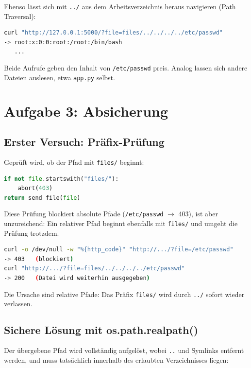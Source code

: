 \documentclass[
	fontsize=12pt,
	paper=a4,
	numbers=noenddot,
	listof=totoc,
	listof=entryprefix,
	listof=nochaptergap,
	bibliography=totoc,
	parskip=half,
	openany
]{scrbook}
\begin{document}
Ebenso lässt sich mit \texttt{../} aus dem Arbeitsverzeichnis heraus navigieren
(Path Traversal):

\begin{lstlisting}[language=bash]
curl "http://127.0.0.1:5000/?file=files/../../../../etc/passwd"
-> root:x:0:0:root:/root:/bin/bash
   ...
\end{lstlisting}

Beide Aufrufe geben den Inhalt von \texttt{/etc/passwd} preis. Analog lassen sich
andere Dateien auslesen, etwa \texttt{app.py} selbst.

\chapter*{Aufgabe 3: Absicherung}

\section*{Erster Versuch: Präfix-Prüfung}

Geprüft wird, ob der Pfad mit \texttt{files/} beginnt:

\begin{lstlisting}[language=Python]
if not file.startswith("files/"):
    abort(403)
return send_file(file)
\end{lstlisting}

Diese Prüfung blockiert absolute Pfade (\texttt{/etc/passwd} $\rightarrow$ 403),
ist aber unzureichend: Ein relativer Pfad beginnt ebenfalls mit \texttt{files/}
und umgeht die Prüfung trotzdem.

\begin{lstlisting}[language=bash]
curl -o /dev/null -w "%{http_code}" "http://.../?file=/etc/passwd"
-> 403   (blockiert)
curl "http://.../?file=files/../../../../etc/passwd"
-> 200   (Datei wird weiterhin ausgegeben)
\end{lstlisting}

Die Ursache sind relative Pfade: Das Präfix \texttt{files/} wird durch
\texttt{../} sofort wieder verlassen.

\section*{Sichere Lösung mit os.path.realpath()}

Der übergebene Pfad wird vollständig aufgelöst, wobei \texttt{..} und Symlinks
entfernt werden, und muss tatsächlich innerhalb des erlaubten Verzeichnisses
liegen:
\end{document}
